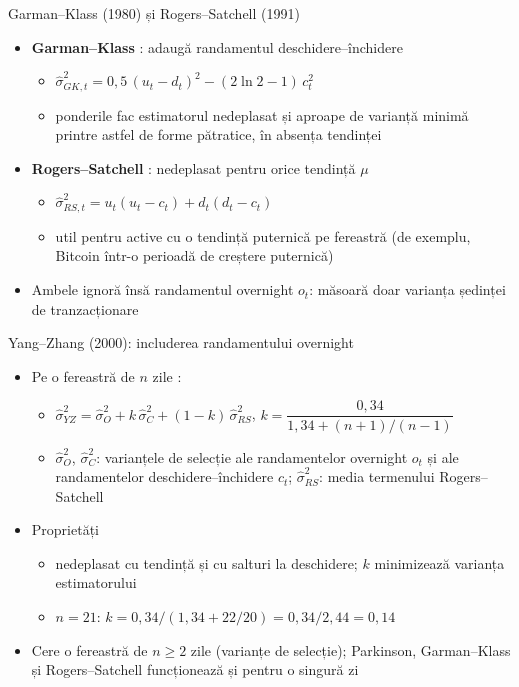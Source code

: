 \begin{frame}{Garman--Klass (1980) și Rogers--Satchell (1991)}
\itemsize{\small}
\begin{itemize}
    \item \textbf{Garman--Klass} : adaugă randamentul deschidere--închidere
    \begin{itemize}
        \item $\hat\sigma_{GK,t}^2 = 0{,}5\,(u_t - d_t)^2 - (2\ln 2 - 1)\,c_t^2$
        \item ponderile fac estimatorul nedeplasat și aproape de varianță minimă printre astfel de forme pătratice, în absența tendinței
    \end{itemize}
    \item \textbf{Rogers--Satchell} : nedeplasat pentru orice tendință $\mu$
    \begin{itemize}
        \item $\hat\sigma_{RS,t}^2 = u_t(u_t - c_t) + d_t(d_t - c_t)$
        \item util pentru active cu o tendință puternică pe fereastră (de exemplu, Bitcoin într-o perioadă de creștere puternică)
    \end{itemize}
    \item Ambele ignoră însă randamentul overnight $o_t$: măsoară doar varianța ședinței de tranzacționare
\end{itemize}
\end{frame}

\begin{frame}{Yang--Zhang (2000): includerea randamentului overnight}
\itemsize{\small}
\begin{itemize}
    \item Pe o fereastră de $n$ zile :
    \begin{itemize}
        \item $\hat\sigma_{YZ}^2 = \hat\sigma_O^2 + k\,\hat\sigma_C^2 + (1-k)\,\hat\sigma_{RS}^2$, \quad $k = \dfrac{0{,}34}{1{,}34 + (n+1)/(n-1)}$
        \item $\hat\sigma_O^2$, $\hat\sigma_C^2$: varianțele de selecție ale randamentelor overnight $o_t$ și ale randamentelor deschidere--închidere $c_t$; $\hat\sigma_{RS}^2$: media termenului Rogers--Satchell
    \end{itemize}
    \item Proprietăți
    \begin{itemize}
        \item nedeplasat cu tendință și cu salturi la deschidere; $k$ minimizează varianța estimatorului
        \item $n = 21$: $k = 0{,}34/(1{,}34 + 22/20) = 0{,}34/2{,}44 = 0{,}14$
    \end{itemize}
    \item Cere o fereastră de $n \ge 2$ zile (varianțe de selecție); Parkinson, Garman--Klass și Rogers--Satchell funcționează și pentru o singură zi
\end{itemize}
\end{frame}

